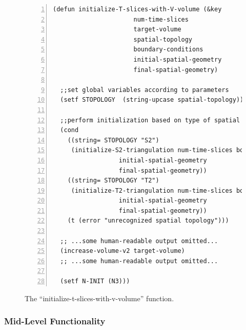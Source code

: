 \documentclass[12pt]{article}
\begin{document}
\begin{figure}[htb]
\begin{small}
\begin{lstlisting}[numbers=left]
(defun initialize-T-slices-with-V-volume (&key 
					  num-time-slices
					  target-volume
					  spatial-topology
					  boundary-conditions
					  initial-spatial-geometry
					  final-spatial-geometry)

  ;;set global variables according to parameters
  (setf STOPOLOGY  (string-upcase spatial-topology))

  ;;perform initialization based on type of spatial topology
  (cond 
    ((string= STOPOLOGY "S2")
     (initialize-S2-triangulation num-time-slices boundary-conditions 
				  initial-spatial-geometry
				  final-spatial-geometry))
    ((string= STOPOLOGY "T2") 
     (initialize-T2-triangulation num-time-slices boundary-conditions
				  initial-spatial-geometry
				  final-spatial-geometry))
    (t (error "unrecognized spatial topology")))
  
  ;; ...some human-readable output omitted... 
  (increase-volume-v2 target-volume)
  ;; ...some human-readable output omitted... 

  (setf N-INIT (N3)))
\end{lstlisting}
\end{small}
\caption{The ``initialize-t-slices-with-v-volume'' function.}
\label{f:itswvv}
\end{figure}

\subsubsection{Mid-Level Functionality}
\label{s:initialization:mid-level-functions}
\end{document}
